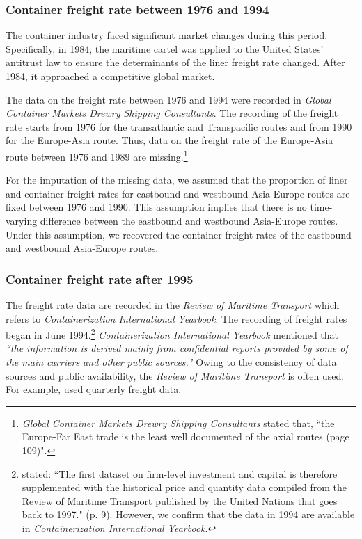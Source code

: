 \subsubsection{Container freight rate between 1976 and 1994}

The container industry faced significant market changes during this period. Specifically, in 1984, the maritime cartel was applied to the United States’ antitrust law to ensure the determinants of the liner freight rate changed. After 1984, it approached a competitive global market.

The data on the freight rate between 1976 and 1994 were recorded in \textit{Global Container Markets Drewry Shipping Consultants}. The recording of the freight rate starts from 1976 for the transatlantic and Transpacific routes and from 1990 for the Europe-Asia route. Thus, data on the freight rate of the Europe-Asia route between 1976 and 1989 are missing.\footnote{\textit{Global Container Markets Drewry Shipping Consultants} stated that, ``the Europe-Far East trade is the least well documented of the axial routes (page 109)".} 

For the imputation of the missing data, we assumed that the proportion of liner and container freight rates for eastbound and westbound Asia-Europe routes are fixed between 1976 and 1990. This assumption implies that there is no time-varying difference between the eastbound and westbound Asia-Europe routes. Under this assumption, we recovered the container freight rates of the eastbound and westbound Asia-Europe routes.



\subsubsection{Container freight rate after 1995}\label{subsec:freight_rate_after_1995}

The freight rate data are recorded in the  \textit{Review of Maritime Transport} which refers to \textit{Containerization International Yearbook}. The recording of freight rates began in June 1994.\footnote{\cite{jeon2022learning} stated: ``The first dataset on firm-level investment and capital is therefore supplemented with the historical price and quantity data compiled from the Review of Maritime Transport published by the United Nations that goes back to 1997." (p. 9). However, we confirm that the data in 1994 are available in \textit{Containerization International Yearbook}.} \textit{Containerization International Yearbook} mentioned that \textit{``the information is derived mainly from confidential reports provided by some of the main carriers and other public sources."} Owing to the consistency of data sources and public availability, the \textit{Review of Maritime Transport} is often used. For example, \cite{jeon2022learning} used quarterly freight data.


